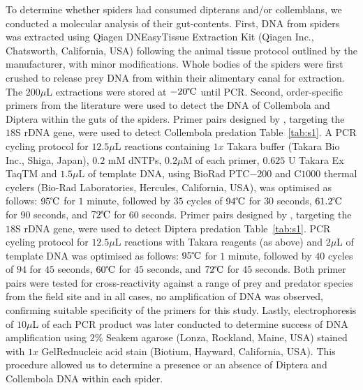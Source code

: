 \documentclass[smallextended]{svjour3}
\begin{document}
To determine whether spiders had consumed dipterans and/or collemblans, we conducted a molecular analysis of their gut-contents.  First, DNA from spiders was extracted using Qiagen DNEasy\circledR Tissue Extraction Kit (Qiagen Inc., Chatsworth, California, USA) following the animal tissue protocol outlined by the manufacturer, with minor modifications.  Whole bodies of the spiders were first crushed to release prey DNA from within their alimentary canal for extraction.  The $200 \mu$L extractions were stored at $-20\celsius$ until PCR.  Second, order-specific primers from the literature were used to detect the DNA of Collembola and Diptera within the guts of the spiders.  Primer pairs designed by \citet{Sint:2012}, targeting the $18$S rDNA gene, were used to detect Collembola predation Table~\ref{tab:s1}.  A PCR cycling protocol for $12.5 \mu$L reactions containing $1x$ Takara buffer (Takara Bio Inc., Shiga, Japan), $0.2$ mM dNTPs, $0.2 \mu$M of each primer, $0.625$ U Takara Ex TaqTM and $1.5 \mu$L of template DNA, using BioRad PTC$-200$ and C$1000$ thermal cyclers (Bio-Rad Laboratories, Hercules, California, USA), was optimised as follows: $95\celsius$ for $1$ minute, followed by $35$ cycles of $94\celsius$ for $30$ seconds, $61.2\celsius$ for $90$ seconds, and $72\celsius$ for $60$ seconds.  Primer pairs designed by \citet{Eitzinger:2014}, targeting the $18$S rDNA gene, were used to detect Diptera predation Table~\ref{tab:s1}.  PCR cycling protocol for $12.5 \mu$L reactions with Takara reagents (as above) and $2 \mu$L of template DNA was optimised as follows: $95\celsius$ for $1$ minute, followed by $40$ cycles of $94$ for $45$ seconds, $60\celsius$ for $45$ seconds, and $72\celsius$ for $45$ seconds.  Both primer pairs were tested for cross-reactivity against a range of prey and predator species from the field site and in all cases, no amplification of DNA was observed, confirming suitable specificity of the primers for this study.  Lastly, electrophoresis of $10 \mu$L of each PCR product was later conducted to determine success of DNA amplification using $2\%$ Seakem agarose (Lonza, Rockland, Maine, USA) stained with $1x$ GelRed\texttrademark nucleic acid stain (Biotium, Hayward, California, USA).  This procedure allowed us to determine a presence or an absence of Diptera and Collembola DNA within each spider. 
\end{document}
